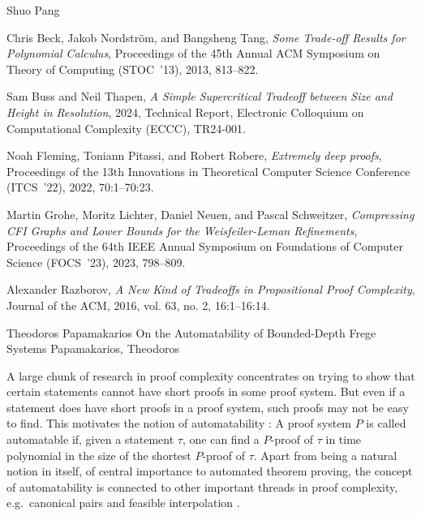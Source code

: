 \documentclass[report]{owrart}
\begin{document}
\begin{report}
\begin{talk}{Shuo Pang}
\begin{thebibliography}{99}
  Chris Beck, Jakob Nordström, and Bangsheng Tang, \textit{Some Trade-off Results for Polynomial Calculus}, Proceedings of the 45th Annual ACM Symposium on Theory of Computing ({STOC}~'13), 2013, 813--822.
  
  Sam Buss and Neil Thapen, \textit{A Simple Supercritical Tradeoff between Size and Height in Resolution}, 2024, Technical Report, {Electronic Colloquium on Computational Complexity (ECCC)}, TR24-001.
  
  Noah Fleming, Toniann Pitassi, and Robert Robere, \textit{Extremely deep proofs}, Proceedings of the 13th Innovations in Theoretical Computer Science Conference ({ITCS}~'22), 2022, 70:1\nobreakdash--70:23.
  
  Martin Grohe, Moritz Lichter, Daniel Neuen, and Pascal Schweitzer, \textit{Compressing {CFI} Graphs and Lower Bounds for the {W}eisfeiler-{L}eman Refinements}, Proceedings of the 64th IEEE Annual Symposium on Foundations of Computer Science ({FOCS}~'23), 2023, 798--809.
  
  Alexander Razborov, \textit{A New Kind of Tradeoffs in Propositional Proof Complexity}, Journal of the ACM, 2016, vol. 63, no. 2, 16:1--16:14.
  
  
  \end{thebibliography}
  
  \end{talk}


\begin{talk}{Theodoros Papamakarios}
  {On the Automatability of Bounded-Depth Frege Systems}
  {Papamakarios, Theodoros}
  
  \noindent
  A large chunk of research in proof complexity concentrates on trying to show that certain statements cannot have short proofs in some proof system. But even if a statement does have short proofs in a proof system, such proofs may not be easy to find. This motivates the notion of automatability \cite{Boneetal00}: A proof system $P$ is called automatable if, given a statement $\tau$, one can find a $P$-proof of $\tau$ in time polynomial in the size of the shortest $P$-proof of $\tau$. Apart from being a natural notion in itself, of central importance to automated theorem proving, the concept of automatability is connected to other important threads in proof complexity, e.g.~canonical pairs and feasible interpolation \cite{Boneetal00,Pudl03,AtseBone04}. 


\end{talk}
\end{report}
\end{document}
